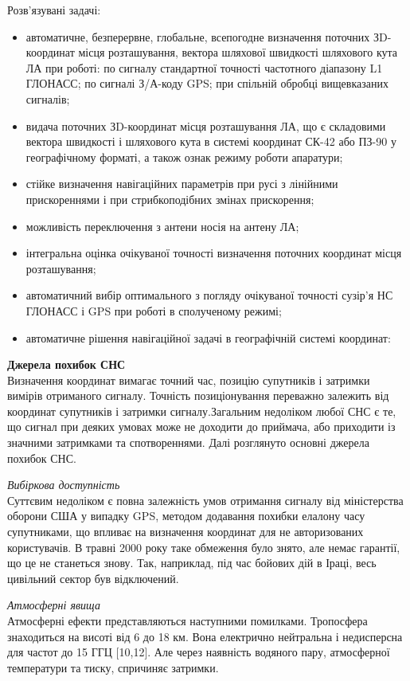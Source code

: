Розв'язувані задачі:
\begin{itemize}
\item автоматичне, безперервне, глобальне, всепогодне визначення поточних ЗD-координат 
місця розташування, вектора шляхової швидкості шляхового кута ЛА при роботі: по 
сигналу стандартної точності частотного діапазону L1 ГЛОНАСС; по сигналі З/А-коду 
GPS; при спільній обробці вищевказаних сигналів;
\item видача поточних ЗD-координат місця розташування ЛА, що є складовими вектора 
швидкості і шляхового кута в системі координат СК-42 або ПЗ-90 у географічному 
форматі, а також ознак режиму роботи апаратури;
\item стійке визначення навігаційних параметрів при русі з лінійними прискореннями 
і при стрибкоподібних змінах прискорення;
\item  можливість переключення з антени носія на антену ЛА; 
\item інтегральна оцінка очікуваної точності визначення поточних координат місця розташування;
\item автоматичний вибір оптимального з погляду очікуваної точності сузір'я НС ГЛОНАСС і GPS при роботі в сполученому режимі;
\item автоматичне рішення навігаційної задачі в географічній системі координат:  
\end{itemize}

\vspace{5mm}
\textbf{Джерела похибок СНС} \\ 
Визначення координат вимагає точний час, позицію супутників і затримки вимірів 
отриманого сигналу. Точність позиціонування переважно залежить від координат 
супутників і затримки сигналу.Загальним недоліком любої СНС є те, що сигнал при деяких умовах може не доходити 
до приймача, або приходити із значними затримками та спотвореннями. Далі розглянуто 
основні джерела похибок СНС.

\vspace{5mm}
\textit{Вибіркова доступність} \\
Суттєвим недоліком є повна залежність умов отримання сигналу від міністерства 
оборони США у випадку GPS, методом додавання похибки елалону часу супутниками, що 
впливає на визначення координат для не авторизованих користувачів. В травні 2000  
року таке обмеження було знято, але немає гарантії, що це не станеться знову. 
Так, наприклад, під час бойових дій в Іраці, весь цивільний сектор був відключений.

\vspace{5mm}
\textit{Атмосферні явища}\\
Атмосферні ефекти представляються наступними помилками. Тропосфера знаходиться 
на висоті від 6 до 18 км. Вона електрично нейтральна і недисперсна для частот 
до 15 ГГЦ [10,12]. Але через наявність водяного пару, атмосферної температури 
та тиску, спричиняє затримки.


